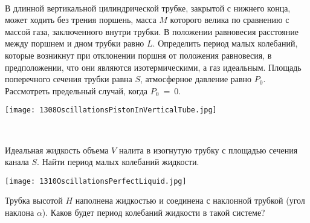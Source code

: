 \begin{ex}
\hspace{0pt} \\
\begin{minipage}{.65\textwidth} 
В длинной вертикальной цилиндрической трубке, закрытой с нижнего конца, может ходить без трения поршень, 
масса $M$ которого велика по сравнению с массой газа, заключенного внутри трубки. В положении равновесия расстояние между поршнем и дном трубки равно $L$. 
Определить период малых колебаний, которые возникнут при отклонении поршня от положения равновесия, в предположении, что они являются изотермическими, 
а газ идеальным. Площадь поперечного сечения трубки равна $S$, атмосферное давление равно $P_0$. Рассмотреть предельный случай, когда $P_0$~=~0.
\end{minipage}
\begin{minipage}{.35\textwidth}
\centering
\texttt{[image: 1308OscillationsPistonInVerticalTube.jpg]}
\end{minipage}
\begin{ans}
\end{ans}
\end{ex}

\begin{ex}
\hspace{0pt} \\
\begin{minipage}{.65\textwidth} 
Идеальная жидкость объема $V$ налита в изогнутую трубку с площадью сечения канала $S$. Найти период малых колебаний жидкости.
\end{minipage}
\begin{minipage}{.35\textwidth}
\centering
\texttt{[image: 1310OscillationsPerfectLiquid.jpg]}
\end{minipage}
\begin{ans}
\end{ans}
\end{ex}

\begin{ex}
Трубка высотой $H$ наполнена жидкостью и соединена с наклонной трубкой (угол наклона $\alpha$). Каков будет период колебаний жидкости в такой системе?
\begin{ans}
\end{ans}
\end{ex}

